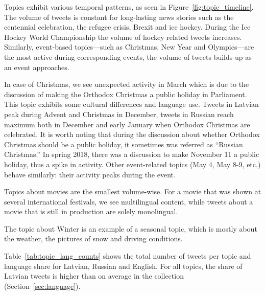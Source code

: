 \documentclass{IOS-Book-Article}
\newcommand{\hl}[1]{#1}
\begin{document}

Topics exhibit various temporal patterns, as seen in Figure~\ref{fig:topic_timeline}. The volume of tweets is constant for long-lasting news stories such as the centennial celebration, the refugee crisis, Brexit and ice hockey.
%
During the Ice Hockey World Championship the volume of hockey related tweets increases. Similarly, event-based topics---such as Christmas, New Year and Olympics---are the most active during corresponding events, the volume of tweets builds up as an event approaches.

In case of Christmas, we see unexpected activity in March which is due to the discussion of making the Orthodox Christmas a public holiday in Parliament. This topic exhibits some cultural differences and language use. Tweets in Latvian peak during Advent and Christmas in December, tweets in Russian reach maximum both in December and early January when Orthodox Christmas are celebrated. It is worth noting that during the discussion about whether Orthodox Christmas should be a public holiday, it sometimes was referred as ``Russian Christmas.'' In spring 2018, there was a discussion to make November 11 a public holiday, thus a spike in activity. Other event-related topics (May 4, May 8-9, etc.) behave similarly: their activity peaks during the event.

Topics about movies are the smallest volume-wise. For a movie that was shown at several international festivals, we see multilingual content, while tweets about a movie that is still in production are solely monolingual.

The topic about Winter is an example of a seasonal topic, which is mostly about the weather, the pictures of snow and driving conditions.

Table~\ref{tab:topic_lang_counts} shows the total number of tweets per topic and language share for Latvian, Russian and English. For \hl{all topics}, the share of Latvian tweets is higher than on average in the collection (Section~\ref{sec:language}).
\end{document}
